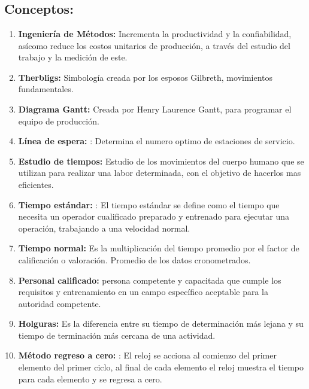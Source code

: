 \section{}
\subsection{Conceptos:}
\begin{enumerate}
\item \textbf{Ingeniería de Métodos:} Incrementa la productividad y la confiabilidad, asícomo reduce los costos unitarios de producción, a través del estudio del trabajo y la medición de este.
\item  \textbf{Therbligs:} Simbología creada por los esposos Gilbreth, movimientos fundamentales.
\item \textbf{Diagrama Gantt:} Creada por Henry Laurence Gantt, para programar el equipo de producción.

\item \textbf{Línea de espera:} : Determina el numero optimo de estaciones de servicio.

\item \textbf{Estudio de tiempos:} Estudio de los movimientos del cuerpo humano que se utilizan para realizar una labor determinada, con el objetivo de hacerlos mas eficientes.
\item \textbf{Tiempo estándar:} : El tiempo estándar se define como el tiempo que necesita un operador cualificado preparado y entrenado para ejecutar una operación, trabajando a una velocidad normal.

\item \textbf{Tiempo normal:} Es la multiplicación del tiempo promedio por el factor de calificación o valoración. Promedio de los datos cronometrados.

\item \textbf{Personal calificado:} persona competente y capacitada que cumple los requisitos y entrenamiento en un campo específico aceptable para la autoridad competente.

\item \textbf{Holguras:} Es la diferencia entre su tiempo de determinación más lejana y su tiempo de terminación más cercana de una actividad.

\item \textbf{Método regreso a cero:} : El reloj se acciona al comienzo del primer elemento del primer ciclo, al final de cada elemento el reloj muestra el tiempo para cada elemento y se regresa a cero.


\end{enumerate}
